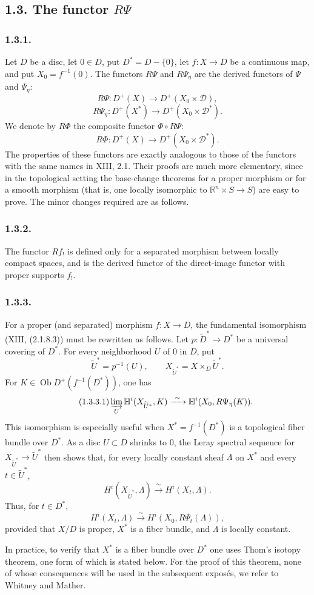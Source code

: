\subsection*{1.3. The functor $R\Psi$}

\subsubsection*{1.3.1.}
Let $D$ be a disc, let $0\in D$, put $D^*=D-\{0\}$, let
$f:X\longrightarrow D$ be a continuous map, and put
$X_0=f^{-1}(0)$.  The functors $R\Psi$ and $R\Psi_\eta$ are the
derived functors of $\Psi$ and $\Psi_\eta$:
\[
R\Psi:D^+(X)\longrightarrow D^+(X_0\times\mathcal D),
\]
\[
R\Psi_\eta:D^+(X^*)\longrightarrow D^+(X_0\times\mathcal D^*).
\]
We denote by $R\Phi$ the composite functor $\Phi\circ R\Psi$:
\[
R\Phi:D^+(X)\longrightarrow D^+(X_0\times\mathcal D^*).
\]
The properties of these functors are exactly analogous to those of
the functors with the same names in XIII, 2.1.  Their proofs are much
more elementary, since in the topological setting the base-change
theorems for a proper morphism or for a smooth morphism (that is,
one locally isomorphic to $\mathbb R^n\times S\longrightarrow S$)
are easy to prove.  The minor changes required are as follows.

\subsubsection*{1.3.2.}
The functor $Rf_!$ is defined only for a separated morphism between
locally compact spaces, and is the derived functor of the direct-image
functor with proper supports $f_!$.

\subsubsection*{1.3.3.}
For a proper (and separated) morphism $f:X\longrightarrow D$, the
fundamental isomorphism (XIII, (2.1.8.3)) must be rewritten as follows.
Let $p:\widetilde D^*\longrightarrow D^*$ be a universal covering of
$D^*$.  For every neighborhood $U$ of $0$ in $D$, put
\[
\widetilde U^*=p^{-1}(U),
\qquad
X_{\widetilde U^*}=X\times_D\widetilde U^*.
\]
For $K\in\operatorname{Ob}D^+(f^{-1}(D^*))$, one has
\begin{equation}\tag{1.3.3.1}
\varinjlim_U\mathbb H^i(X_{\widetilde U^*},K)
\xrightarrow{\ \sim\ }
\mathbb H^i(X_0,R\Psi_{\bar\eta}(K)).
\end{equation}
This isomorphism is especially useful when
$X^*=f^{-1}(D^*)$ is a topological fiber bundle over $D^*$.  As a
disc $U\subset D$ shrinks to $0$, the Leray spectral sequence for
$X_{\widetilde U^*}\longrightarrow\widetilde U^*$ then shows that,
for every locally constant sheaf $\Lambda$ on $X^*$ and every
$t\in\widetilde U^*$,
\[
H^i(X_{\widetilde U^*},\Lambda)
\xrightarrow{\ \sim\ }H^i(X_t,\Lambda).
\]
Thus, for $t\in D^*$,
\begin{equation}\tag{1.3.3.2}
H^i(X_t,\Lambda)
\xrightarrow{\ \sim\ }
H^i(X_0,R\Psi_t(\Lambda)),
\end{equation}
provided that $X/D$ is proper, $X^*$ is a fiber bundle, and
$\Lambda$ is locally constant.

In practice, to verify that $X^*$ is a fiber bundle over $D^*$ one
uses Thom's isotopy theorem, one form of which is stated below.  For
the proof of this theorem, none of whose consequences will be used in
the subsequent expos\'es, we refer to Whitney and Mather.

